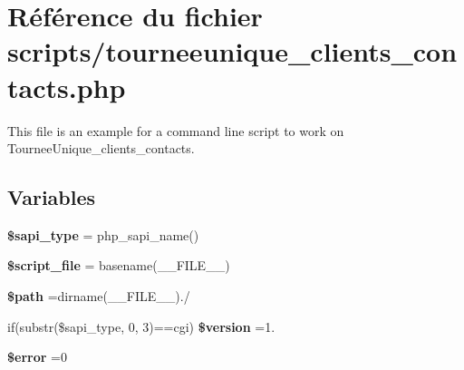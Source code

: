 \hypertarget{tourneeunique__clients__contacts_8php}{}\section{Référence du fichier scripts/tourneeunique\+\_\+clients\+\_\+contacts.php}
\label{tourneeunique__clients__contacts_8php}


This file is an example for a command line script to work on Tournee\+Unique\+\_\+clients\+\_\+contacts.  


\subsection*{Variables}
\begin{DoxyCompactItemize}
\item 
\mbox{\label{tourneeunique__clients__contacts_8php_a86e02f00a36d0fcbf274de973b2640d0}} 
{\bfseries \$sapi\+\_\+type} = php\+\_\+sapi\+\_\+name()
\item 
\mbox{\label{tourneeunique__clients__contacts_8php_a97b9f047572d6c50f29fbea522f6c17e}} 
{\bfseries \$script\+\_\+file} = basename(\+\_\+\+\_\+\+F\+I\+L\+E\+\_\+\+\_\+)
\item 
\mbox{\label{tourneeunique__clients__contacts_8php_a0a4baf0b22973c07685c3981f0d17fc4}} 
{\bfseries \$path} =dirname(\+\_\+\+\_\+\+F\+I\+L\+E\+\_\+\+\_\+).\textquotesingle{}/\textquotesingle{}
\item 
\mbox{\label{tourneeunique__clients__contacts_8php_a0a351317886caa2358df1658880c0c78}} 
if(substr(\$sapi\+\_\+type, 0, 3)==\textquotesingle{}cgi\textquotesingle{}) {\bfseries \$version} =\textquotesingle{}1.\textquotesingle{}
\item 
\mbox{\label{tourneeunique__clients__contacts_8php_aeba2ab722cedda53dbb7ec1a59f45550}} 
{\bfseries \$error} =0
\item 
\mbox{\label{tourneeunique__clients__contacts_8php_a2b87986264c1ca3cddb96a106af7b37a}} 

\end{DoxyCompactItemize}
